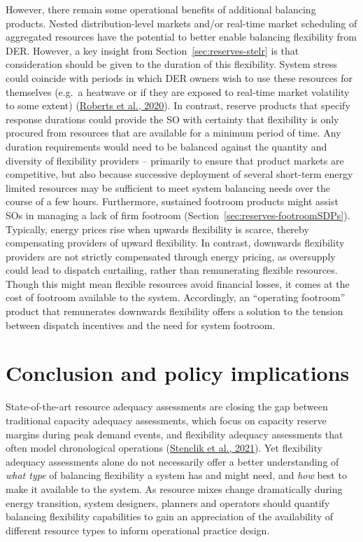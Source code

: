 \documentclass[12pt,a4paper,]{report}
\begin{document}
However, there remain some operational benefits of additional balancing
products. Nested distribution-level markets and/or real-time market
scheduling of aggregated resources have the potential to better enable
balancing flexibility from DER. However, a key insight from
Section~\ref{sec:reserves-stelr} is that consideration should be given
to the duration of this flexibility. System stress could coincide with
periods in which DER owners wish to use these resources for themselves
(e.g.~a heatwave or if they are exposed to real-time market volatility
to some extent)
(\protect\hyperlink{ref-robertsVPPUserResearch2020}{Roberts et al.,
2020}). In contrast, reserve products that specify response durations
could provide the SO with certainty that flexibility is only procured
from resources that are available for a minimum period of time. Any
duration requirements would need to be balanced against the quantity and
diversity of flexibility providers -- primarily to ensure that product
markets are competitive, but also because successive deployment of
several short-term energy limited resources may be sufficient to meet
system balancing needs over the course of a few hours. Furthermore,
sustained footroom products might assist SOs in managing a lack of firm
footroom (Section~\ref{sec:reserves-footroomSDPs}). Typically, energy
prices rise when upwards flexibility is scarce, thereby compensating
providers of upward flexibility. In contrast, downwards flexibility
providers are not strictly compensated through energy pricing, as
oversupply could lead to dispatch curtailing, rather than remunerating
flexible resources. Though this might mean flexible resources avoid
financial losses, it comes at the cost of footroom available to the
system. Accordingly, an ``operating footroom'' product that remunerates
downwards flexibility offers a solution to the tension between dispatch
incentives and the need for system footroom.

\hypertarget{sec:reserves-conclusion}{%
\section{Conclusion and policy
implications}\label{sec:reserves-conclusion}}

State-of-the-art resource adequacy assessments are closing the gap
between traditional capacity adequacy assessments, which focus on
capacity reserve margins during peak demand events, and flexibility
adequacy assessments that often model chronological operations
(\protect\hyperlink{ref-stenclikQuantifyingRiskUncertain2021}{Stenclik
et al., 2021}). Yet flexibility adequacy assessments alone do not
necessarily offer a better understanding of \emph{what type} of
balancing flexibility a system has and might need, and \emph{how} best
to make it available to the system. As resource mixes change
dramatically during energy transition, system designers, planners and
operators should quantify balancing flexibility capabilities to gain an
appreciation of the availability of different resource types to inform
operational practice design.
\end{document}
